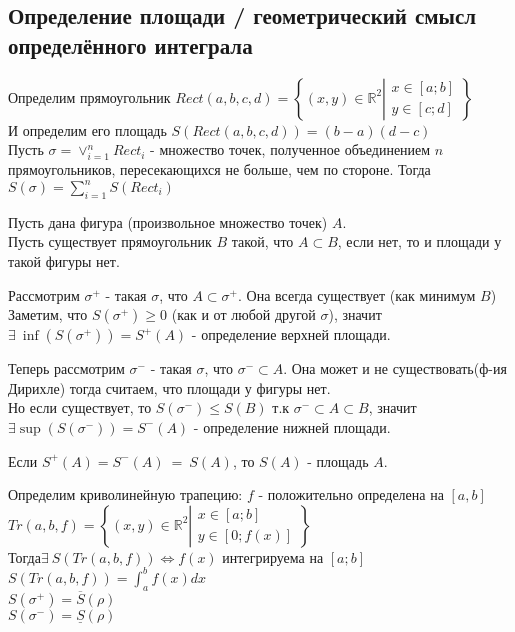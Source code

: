 \documentclass[11pt]{article}
\begin{document}
        \subsection{Определение площади / геометрический смысл определённого интеграла}
        Определим прямоугольник $Rect(a, b, c, d) = \left\{ (x, y) \in \mathbb{R}^2 \left\vert\begin{array}{l}
            x \in [a; b]\\
            y \in [c; d]
        \end{array}\right. \right\}$\\
        И определим его площадь $S(Rect(a, b, c, d)) = (b - a)(d - c)$\\
        Пусть $\sigma = \lor_{i = 1}^{n} Rect_i$ - множество точек, 
        полученное объединением $n$ прямоугольников, пересекающихся не больше, чем по стороне.
        Тогда $S(\sigma) = \sum_{i=1}^{n} S(Rect_i)$

        Пусть дана фигура (произвольное множество точек) $A$.\\
        Пусть существует прямоугольник $B$ такой, что $A \subset B$, если нет, то и площади у такой фигуры нет.

        Рассмотрим $\sigma^+$ - такая $\sigma$, что $A \subset \sigma^+$. Она всегда существует (как минимум $B$)\\
        Заметим, что $S(\sigma^+) \geq 0$ (как и от любой другой $\sigma$),
         значит $\exists\ \inf(S(\sigma^+)) = S^+(A)$ - определение верхней площади.

        Теперь рассмотрим $\sigma^-$ - такая $\sigma$, что $\sigma^- \subset A$. Она может и не существовать(ф-ия Дирихле)
         тогда считаем, что площади у фигуры нет.\\
        Но если существует, то $S(\sigma^-) \leq S(B)$ т.к $\sigma^- \subset A \subset B$, 
         значит $\exists \sup(S(\sigma^-)) = S^-(A)$ - определение нижней площади.

        Если $S^+(A) = S^-(A)\ =\ S(A)$, то $S(A)$ - площадь $A$.

        Определим криволинейную трапецию: $f$ - положительно определена на $[a, b]$\\ $Tr(a, b, f) = \left\{ (x, y) \in \mathbb{R}^2 \left\vert\begin{array}{l}
            x \in [a; b]\\
            y \in [0; f(x)]
        \end{array}\right. \right\}$\\
        Тогда\quad $\exists\ S(Tr(a, b, f)) \iff f(x)$ интегрируема на $[a; b]$\\
        $S(Tr(a, b, f)) = \int_{a}^{b} f(x)dx$\\
        $S(\sigma^+) = \overline{S}(\rho)$\\
        $S(\sigma^-) = \underline{S}(\rho)$
        
\end{document}
